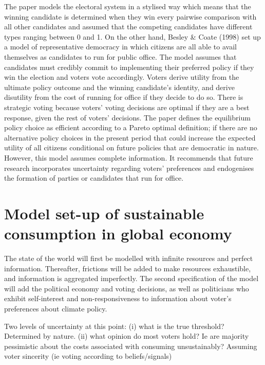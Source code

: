 \documentclass[11pt,preprint, authoryear]{elsarticle}
\numberwithin{equation}{section}
\numberwithin{figure}{section}
\numberwithin{table}{section}
\begin{document}
The paper models the electoral system in a stylised way which means that
the winning candidate is determined when they win every pairwise
comparison with all other candidates and assumed that the competing
candidates have different types ranging between 0 and 1. On the other
hand, Besley \& Coate (1998) set up a model of representative democracy
in which citizens are all able to avail themselves as candidates to run
for public office. The model assumes that candidates must credibly
commit to implementing their preferred policy if they win the election
and voters vote accordingly. Voters derive utility from the ultimate
policy outcome and the winning candidate's identity, and derive
disutility from the cost of running for office if they decide to do so.
There is strategic voting because voters' voting decisions are optimal
if they are a best response, given the rest of voters' decisions. The
paper defines the equilibrium policy choice as efficient according to a
Pareto optimal definition; if there are no alternative policy choices in
the present period that could increase the expected utility of all
citizens conditional on future policies that are democratic in nature.
However, this model assumes complete information. It recommends that
future research incorporates uncertainty regarding voters' preferences
and endogenises the formation of parties or candidates that run for
office.

\hypertarget{model-set-up-of-sustainable-consumption-in-global-economy}{%
\section{Model set-up of sustainable consumption in global
economy}\label{model-set-up-of-sustainable-consumption-in-global-economy}}

The state of the world will first be modelled with infinite resources
and perfect information. Thereafter, frictions will be added to make
resources exhaustible, and information is aggregated imperfectly. The
second specification of the model will add the political economy and
voting decisions, as well as politicians who exhibit self-interest and
non-responsiveness to information about voter's preferences about
climate policy.

Two levels of uncertainty at this point: (i) what is the true threshold?
Determined by nature. (ii) what opinion do most voters hold? Ie are
majority pessimistic about the costs associated with consuming
unsustainably? Assuming voter sincerity (ie voting according to
beliefs/signals)
\end{document}
